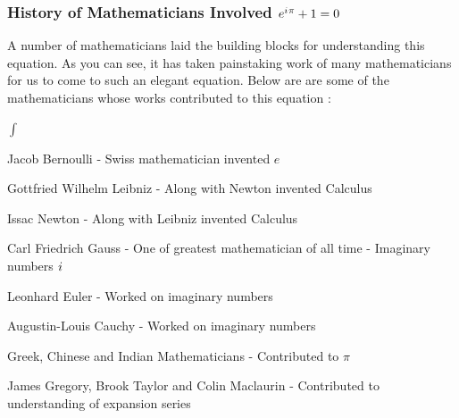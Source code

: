 \documentclass[10pt]{beamer}
\newcommand{\iu}{{i\mkern1mu}}
\begin{document}
\begin{frame}
	\frametitle{ History of Mathematicians Involved \hspace{25pt} \textcolor{pink}{\Huge\(e^{\iu \pi} +1 = 0\)}}

	A number of mathematicians laid the building blocks for understanding this equation.  As you can see, it has taken painstaking work of many mathematicians for us to come to such an elegant equation. Below are are some of the mathematicians whose works contributed to this equation :
	\vspace{10pt}

	\begin{list}{$\int$}{}
		\item Jacob Bernoulli - Swiss mathematician invented $e$
		\item  Gottfried Wilhelm Leibniz  - Along with Newton invented Calculus
		\item Issac Newton - Along with Leibniz invented Calculus
		\item Carl Friedrich Gauss - One of  greatest mathematician of all time - Imaginary numbers $\iu$
		\item Leonhard Euler - Worked on imaginary numbers
		\item Augustin-Louis Cauchy - Worked on imaginary numbers
		\item Greek, Chinese and Indian Mathematicians - Contributed to $\pi$
		\item James Gregory, Brook Taylor and Colin Maclaurin - Contributed to understanding of expansion series
	\end{list}

\end{frame}
\end{document}
